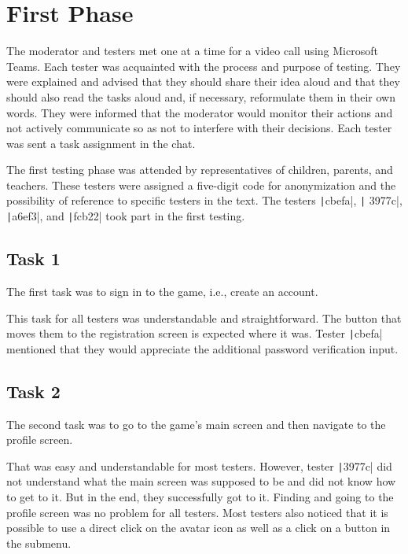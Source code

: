 \section{First Phase}

The moderator and testers met one at a time for a video call using Microsoft Teams.
Each tester was acquainted with the process and purpose of testing.
They were explained and advised that they should share their idea aloud and that they should also read the tasks aloud and, if necessary, reformulate them in their own words.
They were informed that the moderator would monitor their actions and not actively communicate so as not to interfere with their decisions.
Each tester was sent a task assignment in the chat.

The first testing phase was attended by representatives of children, parents, and teachers.
These testers were assigned a five-digit code for anonymization and the possibility of reference to specific testers in the text.
The testers \texttt|cbefa|, \texttt| 3977c|, \texttt|a6ef3|, and \texttt|fcb22| took part in the first testing.

\subsection*{Task 1}

The first task was to sign in to the game, i.e., create an account.

This task for all testers was understandable and straightforward.
The button that moves them to the registration screen is expected where it was.
Tester \texttt|cbefa| mentioned that they would appreciate the additional password verification input.

\subsection*{Task 2}

The second task was to go to the game's main screen and then navigate to the profile screen.

That was easy and understandable for most testers.
However, tester \texttt|3977c| did not understand what the main screen was supposed to be and did not know how to get to it.
But in the end, they successfully got to it.
Finding and going to the profile screen was no problem for all testers.
Most testers also noticed that it is possible to use a direct click on the avatar icon as well as a click on a button in the submenu.

